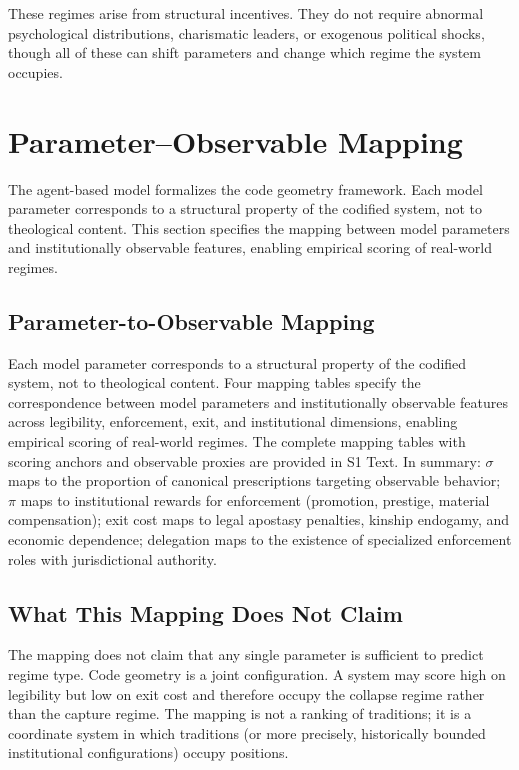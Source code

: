 \documentclass[12pt]{article}
\begin{document}
These regimes arise from structural incentives. They do not require abnormal psychological distributions, charismatic leaders, or exogenous political shocks, though all of these can shift parameters and change which regime the system occupies.

%
\section{Parameter--Observable Mapping}

The agent-based model formalizes the code geometry framework. Each model parameter corresponds to a structural property of the codified system, not to theological content. This section specifies the mapping between model parameters and institutionally observable features, enabling empirical scoring of real-world regimes.

%
\subsection{Parameter-to-Observable Mapping}

Each model parameter corresponds to a structural property of the codified
system, not to theological content. Four mapping tables specify the
correspondence between model parameters and institutionally observable
features across legibility, enforcement, exit, and institutional
dimensions, enabling empirical scoring of real-world regimes. The
complete mapping tables with scoring anchors and observable proxies are
provided in S1 Text. In summary: $\sigma$ maps to the proportion of
canonical prescriptions targeting observable behavior; $\pi$ maps to
institutional rewards for enforcement (promotion, prestige, material
compensation); exit cost maps to legal apostasy penalties, kinship
endogamy, and economic dependence; delegation maps to the existence of
specialized enforcement roles with jurisdictional authority.

\subsection{What This Mapping Does Not Claim}

The mapping does not claim that any single parameter is sufficient to predict regime type. Code geometry is a joint configuration. A system may score high on legibility but low on exit cost and therefore occupy the collapse regime rather than the capture regime. The mapping is not a ranking of traditions; it is a coordinate system in which traditions (or more precisely, historically bounded institutional configurations) occupy positions.
\end{document}
